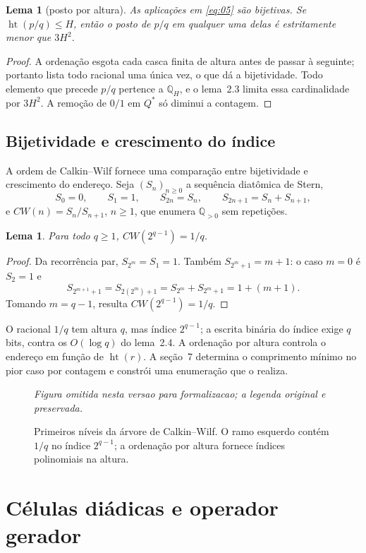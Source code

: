 \documentclass[11pt,a4paper]{article}
\theoremstyle{preciso}
\newtheorem{lema}[teorema]{Lema}
\theoremstyle{definition}
\newcommand{\Q}{\mathbb Q}
\newcommand{\heightq}{\operatorname{ht}}
\newcommand{\eqn}[2]{\begin{equation}\label{eq:#1}#2\end{equation}}
\newcommand{\figura}[4]{\begin{figure}[!htbp]\centering
 \emph{Figura omitida nesta versao para formalizacao; a legenda original e preservada.}
 \caption{#3}\label{fig:#4}\end{figure}}
\begin{document}
\begin{lema}[posto por altura]
As aplicações em \eqref{eq:05} são bijetivas. Se $\heightq(p/q)\le H$, então o posto de $p/q$ em qualquer uma delas é estritamente menor que $3H^2$.
\end{lema}
\begin{proof}
A ordenação esgota cada casca finita de altura antes de passar à seguinte; portanto lista todo racional uma única vez, o que dá a bijetividade. Todo elemento que precede $p/q$ pertence a $\Q_H$, e o lema~2.3 limita essa cardinalidade por $3H^2$. A remoção de $0/1$ em $Q^*$ só diminui a contagem.
\end{proof}

\subsection{Bijetividade e crescimento do índice}
A ordem de Calkin--Wilf fornece uma comparação entre bijetividade e crescimento do endereço. Seja $(S_n)_{n\ge0}$ a sequência diatômica de Stern,
\eqn{08}{S_0=0,\qquad S_1=1,\qquad S_{2n}=S_n,\qquad S_{2n+1}=S_n+S_{n+1},}
e $CW(n)=S_n/S_{n+1}$, $n\ge1$, que enumera $\Q_{>0}$ sem repetições.
\begin{lema}
Para todo $q\ge1$, $CW(2^{q-1})=1/q$.
\end{lema}
\begin{proof}
Da recorrência par, $S_{2^m}=S_1=1$. Também $S_{2^m+1}=m+1$: o caso $m=0$ é $S_2=1$ e
\[
S_{2^{m+1}+1}=S_{2(2^m)+1}=S_{2^m}+S_{2^m+1}=1+(m+1).
\]
Tomando $m=q-1$, resulta $CW(2^{q-1})=1/q$.
\end{proof}

O racional $1/q$ tem altura $q$, mas índice $2^{q-1}$; a escrita binária do índice exige $q$ bits, contra os $O(\log q)$ do lema~2.4. A ordenação por altura controla o endereço em função de $\heightq(r)$. A seção~7 determina o comprimento mínimo no pior caso por contagem e constrói uma enumeração que o realiza.
\figura{01_calkin_wilf}{.94}{Primeiros níveis da árvore de Calkin--Wilf. O ramo esquerdo contém $1/q$ no índice $2^{q-1}$; a ordenação por altura fornece índices polinomiais na altura.}{cw}



\section{Células diádicas e operador gerador}
\end{document}
